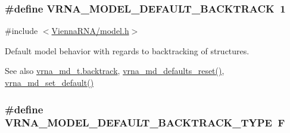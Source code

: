 \subsubsection[{\texorpdfstring{V\+R\+N\+A\+\_\+\+M\+O\+D\+E\+L\+\_\+\+D\+E\+F\+A\+U\+L\+T\+\_\+\+B\+A\+C\+K\+T\+R\+A\+CK}{VRNA_MODEL_DEFAULT_BACKTRACK}}]{\setlength{\rightskip}{0pt plus 5cm}\#define V\+R\+N\+A\+\_\+\+M\+O\+D\+E\+L\+\_\+\+D\+E\+F\+A\+U\+L\+T\+\_\+\+B\+A\+C\+K\+T\+R\+A\+CK~1}\hypertarget{group__model__details_ga3fda8006ab84baf817bd8e5ccbc6bb35}{}\label{group__model__details_ga3fda8006ab84baf817bd8e5ccbc6bb35}


{\ttfamily \#include $<$\hyperlink{model_8h}{Vienna\+R\+N\+A/model.\+h}$>$}



Default model behavior with regards to backtracking of structures. 

\begin{DoxySeeAlso}{See also}
\hyperlink{structvrna__md__s_a31f4471608cbdd03887f63c281823adb}{vrna\+\_\+md\+\_\+t.\+backtrack}, \hyperlink{group__model__details_ga70834424cf804d149937de89f80ceb45}{vrna\+\_\+md\+\_\+defaults\+\_\+reset()}, \hyperlink{group__model__details_ga8ac6ff84936282436f822644bf841f66}{vrna\+\_\+md\+\_\+set\+\_\+default()} 
\end{DoxySeeAlso}
\subsubsection[{\texorpdfstring{V\+R\+N\+A\+\_\+\+M\+O\+D\+E\+L\+\_\+\+D\+E\+F\+A\+U\+L\+T\+\_\+\+B\+A\+C\+K\+T\+R\+A\+C\+K\+\_\+\+T\+Y\+PE}{VRNA_MODEL_DEFAULT_BACKTRACK_TYPE}}]{\setlength{\rightskip}{0pt plus 5cm}\#define V\+R\+N\+A\+\_\+\+M\+O\+D\+E\+L\+\_\+\+D\+E\+F\+A\+U\+L\+T\+\_\+\+B\+A\+C\+K\+T\+R\+A\+C\+K\+\_\+\+T\+Y\+PE~\textquotesingle{}F\textquotesingle{}}\hypertarget{group__model__details_gad0e81fcaca53c4a826c68e0796de2afb}{}\label{group__model__details_gad0e81fcaca53c4a826c68e0796de2afb}


